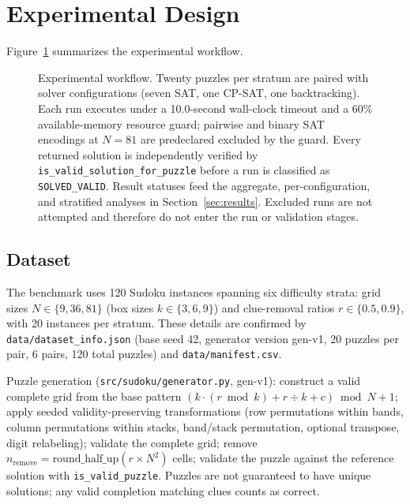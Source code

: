 \documentclass[a4paper,fleqn]{cas-sc}
\newcommand{\code}[1]{\texttt{\nolinkurl{#1}}}
\begin{document}
\section{Experimental Design}\label{sec:design}

Figure~\ref{fig:workflow} summarizes the experimental workflow.

\begin{figure}[htbp]
\centering

\caption{Experimental workflow. Twenty puzzles per stratum are paired with solver configurations (seven SAT, one CP-SAT, one backtracking). Each run executes under a 10.0-second wall-clock timeout and a 60\% available-memory resource guard; pairwise and binary SAT encodings at \(N=81\) are predeclared excluded by the guard. Every returned solution is independently verified by \texttt{is\_valid\_solution\_for\_puzzle} before a run is classified as \texttt{SOLVED\_VALID}. Result statuses feed the aggregate, per-configuration, and stratified analyses in Section~\ref{sec:results}. Excluded runs are not attempted and therefore do not enter the run or validation stages.}
\label{fig:workflow}
\end{figure}

\subsection{Dataset}

The benchmark uses 120 Sudoku instances spanning six difficulty strata: grid sizes \(N \in \{9, 36, 81\}\) (box sizes \(k \in \{3, 6, 9\}\)) and clue-removal ratios \(r \in \{0.5, 0.9\}\), with 20 instances per stratum. These details are confirmed by \code{data/dataset_info.json} (base seed 42, generator version gen-v1, 20 puzzles per pair, 6 pairs, 120 total puzzles) and \code{data/manifest.csv}.

Puzzle generation (\code{src/sudoku/generator.py}, gen-v1): construct a valid complete grid from the base pattern \((k\cdot(r \bmod k) + r \div k + c) \bmod N + 1\); apply seeded validity-preserving transformations (row permutations within bands, column permutations within stacks, band/stack permutation, optional transpose, digit relabeling); validate the complete grid; remove \(n_\text{remove} = \text{round\_half\_up}(r \times N^2)\) cells; validate the puzzle against the reference solution with \texttt{is\_valid\_puzzle}. Puzzles are not guaranteed to have unique solutions; any valid completion matching clues counts as correct.
\end{document}
